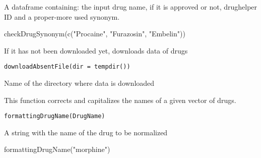 \documentclass[a4paper]{book}
\begin{document}
%
\begin{Value}
A dataframe containing: the input drug name, if it is approved or not, drughelper ID and a proper-more used synonym.
\end{Value}
%
\begin{Examples}
\begin{ExampleCode}

checkDrugSynonym(c("Procaine", "Furazosin", "Embelin"))

\end{ExampleCode}
\end{Examples}
%
\begin{Description}\relax
If it has not been downloaded yet, downloads data of drugs
\end{Description}
%
\begin{Usage}
\begin{verbatim}
downloadAbsentFile(dir = tempdir())
\end{verbatim}
\end{Usage}
%
\begin{Arguments}
\begin{ldescription}
\item[\code{dir}] Name of the directory where data is downloaded
\end{ldescription}
\end{Arguments}
%
\begin{Description}\relax
This function corrects and capitalizes the names of a given vector of drugs.
\end{Description}
%
\begin{Usage}
\begin{verbatim}
formattingDrugName(DrugName)
\end{verbatim}
\end{Usage}
%
\begin{Arguments}
\begin{ldescription}
\item[\code{DrugName}] A string with the name of the drug to be normalized
\end{ldescription}
\end{Arguments}
%
\begin{Examples}
\begin{ExampleCode}
formattingDrugName("morphine")
\end{ExampleCode}
\end{Examples}
\printindex{}
\end{document}
